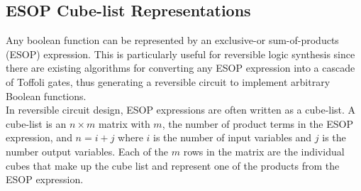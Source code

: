 \subsection{ESOP Cube-list Representations}

Any boolean function can be represented by an exclusive-or sum-of-products (ESOP) expression. This is
particularly useful for reversible logic synthesis since there are existing algorithms for converting 
any ESOP expression into a cascade of Toffoli gates, thus generating a reversible circuit 
to implement arbitrary Boolean functions. \\ 


In reversible circuit design, ESOP expressions are often written as a cube-list. A cube-list is an $ n \times m $
matrix with $m$, the number of product terms in the ESOP expression, and $n = i + j$ where $i$ is the number 
of input variables and $j$ is the number output variables. Each of the $m$ rows in the matrix are the individual
cubes that make up the cube list and represent one of the products from the ESOP expression. \\

